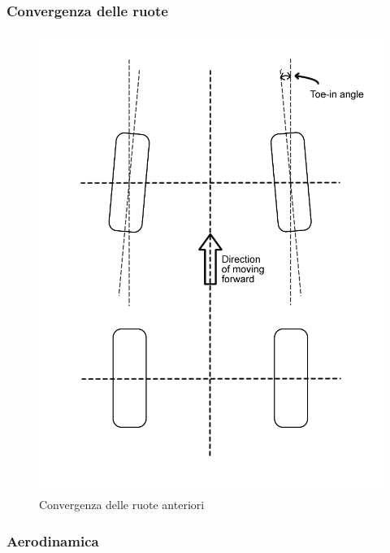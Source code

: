 \subsubsection{Convergenza delle ruote}

\begin{figure}[ht]
    \centering
    \includegraphics[scale=2]{Immagini/Lateral dynamics/Toe-in.png}
    \caption{Convergenza delle ruote anteriori}
    \label{fig:Toe-in}
\end{figure}

\subsubsection{Aerodinamica}